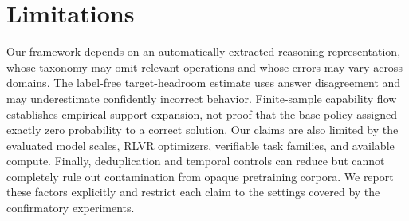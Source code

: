 \section{Limitations}
\label{sec:limitations}

Our framework depends on an automatically extracted reasoning representation,
whose taxonomy may omit relevant operations and whose errors may vary across
domains.  The label-free target-headroom estimate uses answer disagreement and
may underestimate confidently incorrect behavior.  Finite-sample capability
flow establishes empirical support expansion, not proof that the base policy
assigned exactly zero probability to a correct solution.  Our claims are also
limited by the evaluated model scales, RLVR optimizers, verifiable task
families, and available compute.  Finally, deduplication and temporal controls
can reduce but cannot completely rule out contamination from opaque
pretraining corpora.  We report these factors explicitly and restrict each
claim to the settings covered by the confirmatory experiments.

